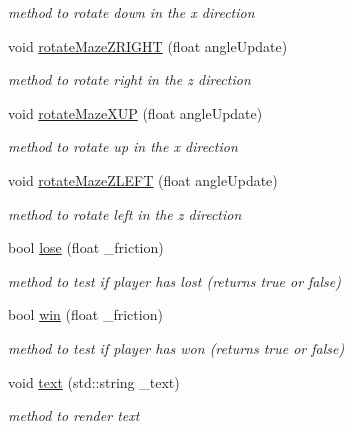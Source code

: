 \begin{DoxyCompactItemize}
\begin{DoxyCompactList}\small\item\em method to rotate down in the x direction \item\end{DoxyCompactList}\item 
void \hyperlink{classNGLDraw_a52716a5b69085b95eec3f0a554d0442e}{rotateMazeZRIGHT} (float angleUpdate)
\begin{DoxyCompactList}\small\item\em method to rotate right in the z direction \item\end{DoxyCompactList}\item 
void \hyperlink{classNGLDraw_aaf8beae970dc7a77cb7bfd56b875c412}{rotateMazeXUP} (float angleUpdate)
\begin{DoxyCompactList}\small\item\em method to rotate up in the x direction \item\end{DoxyCompactList}\item 
void \hyperlink{classNGLDraw_a85f7d53c6fc180ca96a916d859e054da}{rotateMazeZLEFT} (float angleUpdate)
\begin{DoxyCompactList}\small\item\em method to rotate left in the z direction \item\end{DoxyCompactList}\item 
bool \hyperlink{classNGLDraw_a2063f77a75af245c035db344e14dcff6}{lose} (float \_\-friction)
\begin{DoxyCompactList}\small\item\em method to test if player has lost (returns true or false) \item\end{DoxyCompactList}\item 
bool \hyperlink{classNGLDraw_a973c98c0b531ffb824913d6753948508}{win} (float \_\-friction)
\begin{DoxyCompactList}\small\item\em method to test if player has won (returns true or false) \item\end{DoxyCompactList}\item 
void \hyperlink{classNGLDraw_a1019ca5abe411c3111cbe3f77e8218b6}{text} (std::string \_\-text)
\begin{DoxyCompactList}\small\item\em method to render text \item\end{DoxyCompactList}\item 

\end{DoxyCompactItemize}

